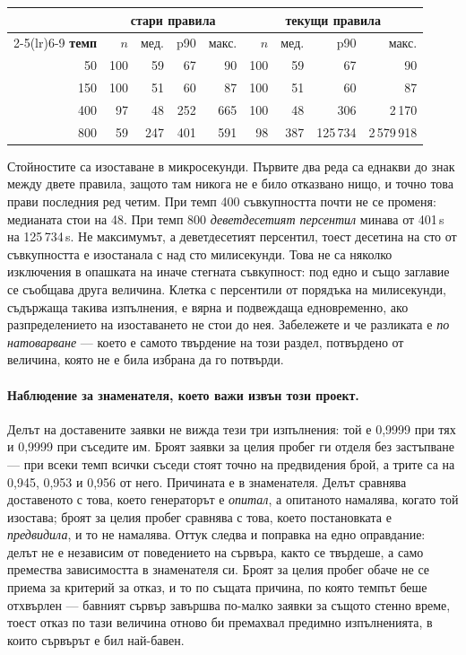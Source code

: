 \begin{center}\small
\begin{tabular}{r rrrr rrrr}
\toprule
& \multicolumn{4}{c}{\textbf{стари правила}} & \multicolumn{4}{c}{\textbf{текущи правила}} \\
\cmidrule(lr){2-5}\cmidrule(lr){6-9}
\textbf{темп} & $n$ & мед. & p90 & макс. & $n$ & мед. & p90 & макс. \\
\midrule
 50 & 100 &  59 &  67 &  90 & 100 &  59 &      67 &        90 \\
150 & 100 &  51 &  60 &  87 & 100 &  51 &      60 &        87 \\
400 &  97 &  48 & 252 & 665 & 100 &  48 &     306 &     2\,170 \\
800 &  59 & 247 & 401 & 591 &  98 & 387 & 125\,734 & 2\,579\,918 \\
\bottomrule
\end{tabular}
\end{center}
\noindent Стойностите са изоставане в микросекунди. Първите два реда са еднакви до знак между двете
правила, защото там никога не е било отказвано нищо, и точно това прави последния ред четим.
При темп 400 съвкупността почти не се променя: медианата стои на 48. При темп 800
\emph{деветдесетият персентил} минава от 401\,\textmu s на 125\,734\,\textmu s. Не максимумът, а
деветдесетият персентил, тоест десетина на сто от съвкупността е изостанала с над сто милисекунди.
Това не са няколко изключения в опашката на иначе стегната съвкупност: под едно и също заглавие се
съобщава друга величина. Клетка с персентили от порядъка на милисекунди, съдържаща такива изпълнения,
е вярна и подвеждаща едновременно, ако разпределението на изоставането не стои до нея. Забележете и
че разликата е \emph{по натоварване} — което е самото твърдение на този раздел, потвърдено от
величина, която не е била избрана да го потвърди.

\paragraph{Наблюдение за знаменателя, което важи извън този проект.} Делът на доставените заявки не
вижда тези три изпълнения: той е 0,9999 при тях и 0,9999 при съседите им. Броят заявки за целия
пробег ги отделя без застъпване — при всеки темп всички съседи стоят точно на предвидения брой, а
трите са на 0,945, 0,953 и 0,956 от него. Причината е в знаменателя. Делът сравнява доставеното с
това, което генераторът е \emph{опитал}, а опитаното намалява, когато той изостава; броят за целия
пробег сравнява с това, което постановката е \emph{предвидила}, и то не намалява. Оттук следва и
поправка на едно оправдание: делът не е независим от поведението на сървъра, както се твърдеше, а
само премества зависимостта в знаменателя си. Броят за целия пробег обаче не се приема за критерий за
отказ, и то по същата причина, по която темпът беше отхвърлен — бавният сървър завършва по-малко
заявки за същото стенно време, тоест отказ по тази величина отново би премахвал предимно
изпълненията, в които сървърът е бил най-бавен.

